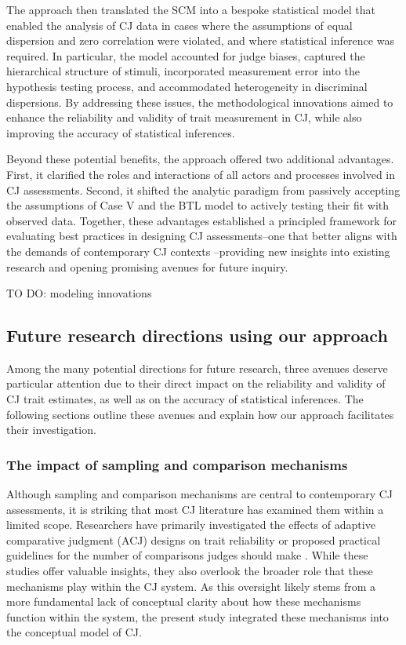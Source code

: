 \documentclass[
  authoryear,
  review,
  1p]{elsarticle}
\begin{document}
The approach then translated the SCM into a bespoke statistical model
that enabled the analysis of CJ data in cases where the assumptions of
equal dispersion and zero correlation were violated, and where
statistical inference was required. In particular, the model accounted
for judge biases, captured the hierarchical structure of stimuli,
incorporated measurement error into the hypothesis testing process, and
accommodated heterogeneity in discriminal dispersions. By addressing
these issues, the methodological innovations aimed to enhance the
reliability and validity of trait measurement in CJ, while also
improving the accuracy of statistical inferences.

Beyond these potential benefits, the approach offered two additional
advantages. First, it clarified the roles and interactions of all actors
and processes involved in CJ assessments. Second, it shifted the
analytic paradigm from passively accepting the assumptions of Case V and
the BTL model to actively testing their fit with observed data.
Together, these advantages established a principled framework for
evaluating best practices in designing CJ assessments--one that better
aligns with the demands of contemporary CJ contexts
\citep{Kelly_et_al_2022}--providing new insights into existing research
and opening promising avenues for future inquiry.

{TO DO: modeling innovations}

\subsection{Future research directions using our
approach}\label{sec-discussion_RA}

Among the many potential directions for future research, three avenues
deserve particular attention due to their direct impact on the
reliability and validity of CJ trait estimates, as well as on the
accuracy of statistical inferences. The following sections outline these
avenues and explain how our approach facilitates their investigation.

\subsubsection{The impact of sampling and comparison
mechanisms}\label{sec-discussion_RA1}

Although sampling and comparison mechanisms are central to contemporary
CJ assessments, it is striking that most CJ literature has examined them
within a limited scope. Researchers have primarily investigated the
effects of adaptive comparative judgment (ACJ) designs on trait
reliability
\citep{Pollitt_2012a, Pollitt_2012b, Bramley_2015, Verhavert_et_al_2022, Mikhailiuk_et_al_2021}
or proposed practical guidelines for the number of comparisons judges
should make \citep{Verhavert_et_al_2019, Crompvoets_et_al_2022}. While
these studies offer valuable insights, they also overlook the broader
role that these mechanisms play within the CJ system. As this oversight
likely stems from a more fundamental lack of conceptual clarity about
how these mechanisms function within the system, the present study
integrated these mechanisms into the conceptual model of CJ.
\end{document}

